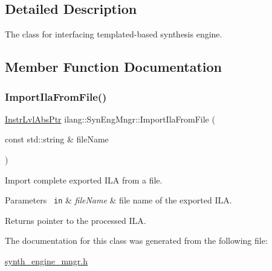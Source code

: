 \subsection{Detailed Description}
The class for interfacing templated-\/based synthesis engine. 

\subsection{Member Function Documentation}
\mbox{\label{classilang_1_1_syn_eng_mngr_a01fbc4b3acceda0511cb499f7e1c2781}} 
\subsubsection{\texorpdfstring{Import\+Ila\+From\+File()}{ImportIlaFromFile()}}
{\footnotesize\ttfamily \mbox{\hyperlink{namespaceilang_ad1b30fdf347e493b3937143da05d1a72}{Instr\+Lvl\+Abs\+Ptr}} ilang\+::\+Syn\+Eng\+Mngr\+::\+Import\+Ila\+From\+File (\begin{DoxyParamCaption}\item[{const std\+::string \&}]{file\+Name }\end{DoxyParamCaption})}



Import complete exported I\+LA from a file. 


\begin{DoxyParams}[1]{Parameters}
\mbox{\texttt{ in}}  & {\em file\+Name} & file name of the exported I\+LA. \\
\hline
\end{DoxyParams}
\begin{DoxyReturn}{Returns}
pointer to the processed I\+LA. 
\end{DoxyReturn}


The documentation for this class was generated from the following file\+:\begin{DoxyCompactItemize}
\item 
\mbox{\hyperlink{synth__engine__mngr_8h}{synth\+\_\+engine\+\_\+mngr.\+h}}\end{DoxyCompactItemize}
